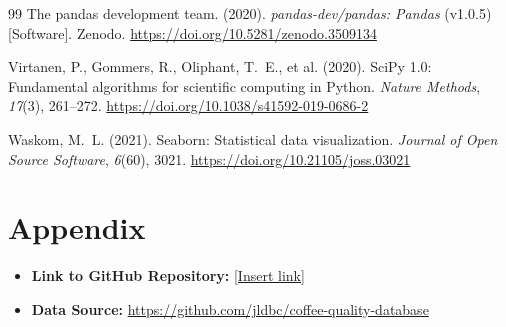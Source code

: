 \documentclass[12pt, a4paper]{article}
\begin{document}
\begin{thebibliography}{99}
The pandas development team. (2020). \textit{pandas-dev/pandas: Pandas} (v1.0.5) [Software].
Zenodo. \url{https://doi.org/10.5281/zenodo.3509134}

Virtanen, P., Gommers, R., Oliphant, T.~E., et al. (2020). SciPy 1.0: Fundamental algorithms
for scientific computing in Python. \textit{Nature Methods}, \textit{17}(3), 261--272.
\url{https://doi.org/10.1038/s41592-019-0686-2}

Waskom, M.~L. (2021). Seaborn: Statistical data visualization. \textit{Journal of Open Source
Software}, \textit{6}(60), 3021. \url{https://doi.org/10.21105/joss.03021}

\end{thebibliography}

\section*{Appendix}

\begin{itemize}
  \item \textbf{Link to GitHub Repository:} \url{[Insert link]}
  \item \textbf{Data Source:} \url{https://github.com/jldbc/coffee-quality-database}
\end{itemize}
\end{document}
